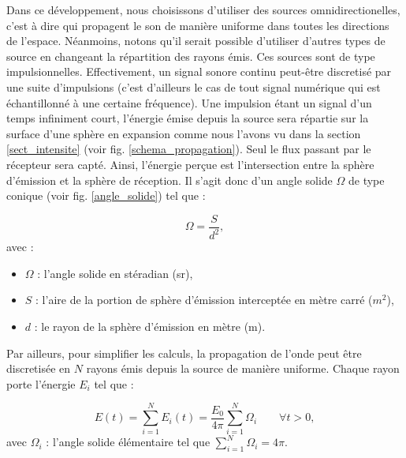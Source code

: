 Dans ce développement, nous choisissons d'utiliser des sources omnidirectionelles, c'est à dire qui propagent le son de manière uniforme dans toutes les directions de l'espace. Néanmoins, notons qu'il serait possible d'utiliser d'autres types de source en changeant la répartition des rayons émis. Ces sources sont de type impulsionnelles. Effectivement, un signal sonore continu peut-être discretisé par une suite d'impulsions (c'est d'ailleurs le cas de tout signal numérique qui est échantillonné à une certaine fréquence). Une impulsion étant un signal d'un temps infiniment court, l'énergie émise depuis la source sera répartie sur la surface d'une sphère en expansion comme nous l'avons vu dans la section \ref{sect_intensite} (voir fig. \ref{schema_propagation}). Seul le flux passant par le récepteur sera capté. Ainsi, l'énergie perçue est l'intersection entre la sphère d'émission et la sphère de réception. Il s'agit donc d'un angle solide $\Omega$ de type conique (voir fig. \ref{angle_solide}) tel que :

\begin{equation}
\Omega =\frac{S}{d^2},
\end{equation}
avec  :
\begin{itemize}
\item $\Omega$ : l'angle solide en stéradian (sr),
\item $S$ : l'aire de la portion de sphère d'émission interceptée en mètre carré ($m^2$),
\item $d$ : le rayon de la sphère d'émission en mètre (m).
\end{itemize}


Par ailleurs, pour simplifier les calculs, la propagation de l'onde peut être discretisée en $N$ rayons émis depuis la source de manière uniforme. Chaque rayon porte l'énergie $E_i$ tel que :

\begin{equation}
E(t) = \sum_{i=1}^N E_i(t) = \frac{E_0}{4\pi}  \sum_{i=1}^N \Omega_i  \qquad \forall t > 0,
\end{equation}
avec  $\Omega_i$ : l'angle solide élémentaire tel que $ \sum_{i=1}^N \Omega_i = 4\pi$. \\



